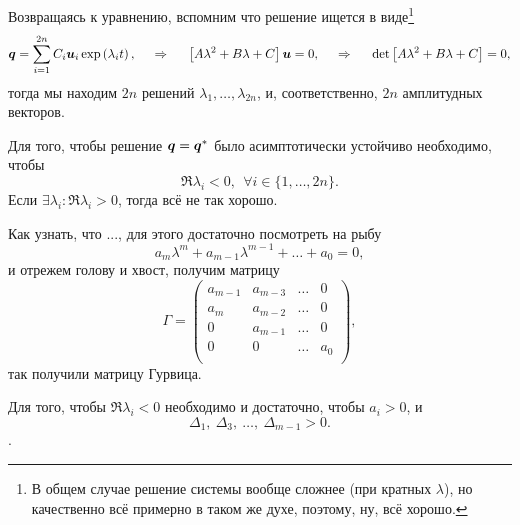 Возвращаясь к уравнению, вспомним что решение ищется в виде\footnote{
    В общем случае решение системы вообще сложнее (при кратных $\lambda$), но качественно всё примерно в таком же духе, поэтому, ну, всё хорошо.
} 
\begin{equation*}
    \mbox{\boldmath $q$} = \sum_{i=1}^{2n} C_i \mbox{\boldmath $u$}_i \exp\left(
        \lambda_i t
    \right),
    \hspace{0.5cm} \Rightarrow \hspace{0.5cm}
    \left[
        A \lambda^2 + B \lambda + C
    \right] \mbox{\boldmath $u$} = 0,
    \hspace{0.5cm} \Rightarrow \hspace{0.5cm}
    \det\left[
        A \lambda^2 + B \lambda + C
    \right] = 0,
\end{equation*}
тогда мы находим $2n$ решений $\lambda_1, \ldots, \lambda_{2n}$, и, соответственно, $2n$ амплитудных векторов.


\begin{to_thr}
    Для того, чтобы решение $\mbox{\boldmath $q$} = \mbox{\boldmath $q$}^*$ было асимптотически устойчиво необходимо, чтобы
    \begin{equation*}
        \Re \lambda_i < 0, \ \ \forall i \in \{1, \ldots, 2n\}.
    \end{equation*}
    Если $\exists \lambda_i \colon \Re \lambda_i > 0$, тогда всё не так хорошо.
\end{to_thr}


Как узнать, что ..., для этого достаточно посмотреть на рыбу
\begin{equation*}
    a_m \lambda^m + a_{m-1} \lambda^{m-1} + \ldots + a_0 = 0,
\end{equation*}
и отрежем голову и хвост, получим матрицу
\begin{equation*}
    \Gamma = \begin{pmatrix}
        a_{m-1} & a_{m-3} & \ldots & 0\\
        a_m & a_{m-2} & \ldots & 0 \\ 
        0 & a_{m-1} & \ldots & 0 \\
        0 & 0 & \ldots & a_0 \\
    \end{pmatrix},
\end{equation*}
так получили матрицу Гурвица.

\begin{to_thr}
    Для того, чтобы $\Re \lambda_i < 0$ необходимо и достаточно, чтобы $a_i > 0$, и
    \begin{equation*}
        \Delta_1, \ \Delta_3, \ \ldots,\ \Delta_{m-1} > 0.
    \end{equation*}
    .
\end{to_thr}